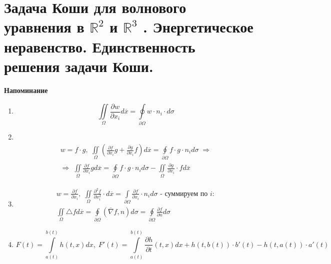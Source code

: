 \chapter{Задача Коши для волнового уравнения в $\mathbb{R}^2$ и $\mathbb{R}^3$ . Энергетическое неравенство. Единственность решения задачи Коши.}
\label{cha:6}

\textbf{Напоминание}

\begin{enumerate}
	\item {}
		$$\underset{\Omega}{\overset{}{\iint}} \frac{\partial w}{\partial x_i} d \overline{x} = \underset{\partial \Omega}{\overset{}{\oint}} w \cdot n_i \cdot d \sigma$$
	\item {}\\
		$$\begin{gathered}
			w = f \cdot g, \; \underset{\Omega}{\overset{}{\iint}} (\frac{\partial f}{\partial x_i} g + \frac{\partial g}{\partial x_i} f) d \overline{x} = \underset{\partial \Omega}{\overset{}{\oint}}  f \cdot g \cdot n_i d \sigma \; \Rightarrow \\
			\Rightarrow \; \underset{\Omega}{\overset{}{\iint}} \frac{\partial f}{\partial x_i} g d \overline{x} = \underset{\partial \Omega}{\overset{}{\oint}} f \cdot g \cdot n_i d\sigma - \underset{\Omega}{\overset{}{\iint}} \frac{\partial g}{\partial x_i} \cdot f d \overline{x}
		\end{gathered}$$
	\item {}
		$$\begin{gathered}
			w = \frac{\partial f}{\partial x_i}, \; \underset{\Omega}{\overset{}{\iint}} \frac{\partial^2 f}{\partial x_i^2} \cdot d \overline{x} = \underset{\partial \Omega}{\overset{}{\int}} \frac{\partial f}{\partial x_i} \cdot n_i d\sigma \text{ - суммируем по } i: \\
			\underset{\Omega}{\overset{}{\iint}} \triangle f d \overline{x} = \underset{\partial \Omega}{\overset{}{\oint}} (\overline{\nabla} f, n) d\sigma = \underset{\partial \Omega}{\overset{}{\oint}} \frac{\partial f}{\partial \overline{n}} d\sigma
		\end{gathered}$$
	\item {}
		$$F(t) = \underset{a(t)}{\overset{b(t)}{\int}}h(t,x) dx, \; F'(t) = \underset{a(t)}{\overset{b(t)}{\int}}\frac{\partial h}{\partial t} (t,x) dx + h(t, b(t)) \cdot b'(t) - h(t, a(t)) \cdot a'(t)$$
\end{enumerate}

